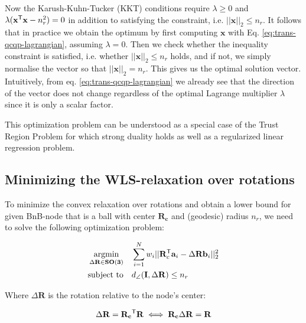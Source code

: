 Now the Karush-Kuhn-Tucker (KKT) conditions require $\lambda \geq 0$ and $\lambda (
\mathbf{x}^{\mathsf{T}} \mathbf{x} - n_r^2) = 0$ in addition to satisfying the constraint, i.e. $|| \mathbf{x}||_2 \leq n_r$. It follows that in practice we obtain the optimum by first computing $\mathbf{x}$ with Eq. \ref{eq:trans-qcqp-lagrangian}, assuming $\lambda = 0$. Then we check whether the inequality constraint is satisfied, i.e. whether $|| \mathbf{x}||_2 \leq n_r$ holds, and if not, we simply normalise the vector so that $|| \mathbf{x}||_2 = n_r$. This gives us the optimal solution vector. Intuitively, from eq. \ref{eq:trans-qcqp-lagrangian} we already see that the direction of the vector does not change regardless of the optimal Lagrange multiplier $\lambda$ since it is only a scalar factor.  

This optimization problem can be understood as a special case of the Trust Region Problem for which strong duality holds \cite[Ch. 5.2, p.229]{Boyd_Vandenberghe_2004} as well as a regularized linear regression problem.



\subsection{Minimizing the WLS-relaxation over rotations}

To minimize the convex relaxation over rotations and obtain a lower bound for given BnB-node that is a ball with center $\mathbf{R_c}$ and (geodesic) radius $n_r$, we need to solve the following optimization problem:

\begin{equation}
	\label{eq:tls-rwls}
	\begin{aligned}
		\operatorname*{argmin}_{\Delta \mathbf{R} \in \mathbf{SO(3)}}  \quad &\sum_{i=1}^{N} w_i ||\mathbf{R}_c^{\mathsf{T}} \mathbf{a}_i - \Delta\mathbf{R} \mathbf{b}_i ||_2^2 \\
		\text{subject to} \quad &d_{\angle}(\mathbf{I}, \Delta\mathbf{R}) \leq n_r
	\end{aligned}
\end{equation}

Where $\Delta\mathbf{R}$ is the rotation relative to the node's center: 

\begin{equation}
	\begin{aligned}
		\Delta\mathbf{R} = \mathbf{R_c}^{\mathsf{T}}\mathbf{R} \iff \mathbf{R_c}\Delta\mathbf{R} = \mathbf{R}
	\end{aligned}
\end{equation}

